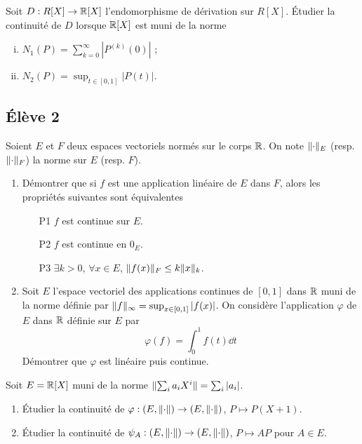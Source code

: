 \documentclass[10pt]{scrartcl}
\begin{document}
    \begin{exo}
        Soit $D:R[X]\to\operatorname{\mathbb R}[X]$ l'endomorphisme de dérivation sur $R[X]$.
        Étudier la continuité de $D$ lorsque $\operatorname{\mathbb R}[X]$ est muni de la norme 
        \begin{enumerate}[(i)]
            \item $N_1(P)=\sum_{k=0}^\infty|P^{(k)}(0)|$ ;
            \item $N_2(P)=\sup_{t\in[0,1]}|P(t)|$.
        \end{enumerate}
    \end{exo}
 

    \subsection*{Élève 2}

    \begin{ccp}
        Soient $E$ et $F$ deux espaces vectoriels normés sur le corps $\operatorname{\mathbb R}$.
        On note $\lVert \cdot\rVert_E$ (resp. $\lVert \cdot\rVert_F$) la norme sur $E$ (resp. $F$).
        \begin{enumerate}
            \item Démontrer que si $f$ est une application linéaire de $E$ dans $F$, alors les propriétés suivantes sont équivalentes 
            \begin{itemize}
                \item[P1] $f$ est continue sur $E$.
                \item[P2] $f$ est continue en $0_E$.
                \item[P3] $\exists k>0$, $\forall x\in E$, $\lVert f(x)\rVert_F\leq k\lVert x\rVert_k$. 
            \end{itemize}
            \item Soit $E$ l'espace vectoriel des applications continues de $[0,1]$ dans $\operatorname{\mathbb R}$ muni de la norme définie par $\lVert f\rVert_\infty=\sup_{x\in[0,1]}|f(x)|$. 
            On considère l'application $\varphi$ de $E$ dans $\operatorname{\mathbb R}$ définie sur $E$ par
            \[
                \varphi(f)=\int_0^1f(t)\dd t
            \]
            Démontrer que $\varphi$ est linéaire puis continue.
        \end{enumerate}
    \end{ccp}

    \begin{exo}
        Soit $E=\operatorname{\mathbb R}[X]$ muni de la norme $\lVert \sum_ia_iX^i\rVert=\sum_i|a_i|$.
        \begin{enumerate}
            \item Étudier la continuité de $\varphi:(E,\lVert \cdot\rVert)\to(E,\lVert \cdot\rVert)$, $P\mapsto P(X+1)$. 
            \item Étudier la continuité de $\psi_A:(E,\lVert \cdot\rVert)\to(E,\lVert \cdot\rVert)$, $P\mapsto AP$ pour $A\in E$.
        \end{enumerate}
    \end{exo}
\end{document}
